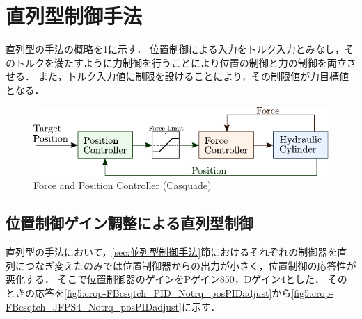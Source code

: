 \newpage
\section{直列型制御手法}
直列型の手法の概略を\figname\ref{fig5:casquade_torqueandposition}に示す．
位置制御による入力をトルク入力とみなし，そのトルクを満たすように力制御を行うことにより位置の制御と力の制御を両立させる．
また，トルク入力値に制限を設けることにより，その制限値が力目標値となる．

\begin{figure}[t]
    \centering
        \includegraphics[keepaspectratio, scale = 1.0]{contents/IntegrationControl/figure/casquade_torqueandposition.pdf}
        \caption{Force and Position Controller (Casquade)}
        \label{fig5:casquade_torqueandposition}
\end{figure}

\subsection{位置制御ゲイン調整による直列型制御}
直列型の手法において，\ref{sec:並列型制御手法}節におけるそれぞれの制御器を直列につなぎ変えたのみでは位置制御器からの出力が小さく，位置制御の応答性が悪化する．
そこで位置制御器のゲインをPゲイン850，Dゲイン4とした．
そのときの応答を\figname\ref{fig5:crop-FBcsqtch_PID_Notrq_posPIDadjust}から\figname\ref{fig5:crop-FBcsqtch_JFPS4_Notrq_posPIDadjust}に示す．


